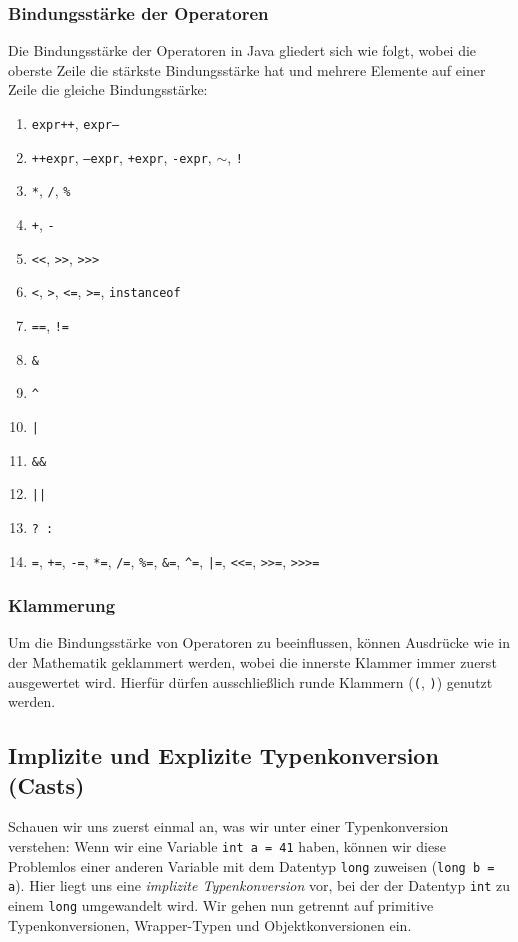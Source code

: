 	\subsubsection{Bindungsstärke der Operatoren}
		Die Bindungsstärke der Operatoren in Java gliedert sich wie folgt, wobei die oberste Zeile die stärkste Bindungsstärke hat und mehrere Elemente auf einer Zeile die gleiche Bindungsstärke:
		\begin{enumerate}
			\item \texttt{expr++}, \texttt{expr--}
			\item \texttt{++expr}, \texttt{--expr}, \texttt{+expr}, \texttt{-expr}, \texttt{\(\sim\)}, \texttt{!}
			\item \texttt{*}, \texttt{/}, \texttt{\%}
			\item \texttt{+}, \texttt{-}
			\item \texttt{<{}<}, \texttt{>{}>}, \texttt{>{}>{}>}
			\item \texttt{<}, \texttt{>}, \texttt{<=}, \texttt{>=}, \texttt{instanceof}
			\item \texttt{==}, \texttt{!=}
			\item \texttt{\&}
			\item \texttt{\^}
			\item \texttt{|}
			\item \texttt{\&\&}
			\item \texttt{||}
			\item \texttt{? :}
			\item \texttt{=}, \texttt{+=}, \texttt{-=}, \texttt{*=}, \texttt{/=}, \texttt{\%=}, \texttt{\&=}, \texttt{\^{}=}, \texttt{|=}, \texttt{<{}<=}, \texttt{>{}>=}, \texttt{>{}>{}>=}
		\end{enumerate}
	
	\subsubsection{Klammerung}
		Um die Bindungsstärke von Operatoren zu beeinflussen, können Ausdrücke wie in der Mathematik geklammert werden, wobei die innerste Klammer immer zuerst ausgewertet wird. Hierfür dürfen ausschließlich runde Klammern (\texttt{(}, \texttt{)}) genutzt werden.

\subsection{Implizite und Explizite Typenkonversion (Casts)}
	Schauen wir uns zuerst einmal an, was wir unter einer Typenkonversion verstehen: Wenn wir eine Variable \lstinline|int a = 41| haben, können wir diese Problemlos einer anderen Variable mit dem Datentyp \lstinline|long| zuweisen (\lstinline|long b = a|). Hier liegt uns eine \textit{implizite Typenkonversion} vor, bei der der Datentyp \lstinline|int| zu einem \lstinline|long| umgewandelt wird. Wir gehen nun getrennt auf primitive Typenkonversionen, Wrapper-Typen und Objektkonversionen ein.
	
